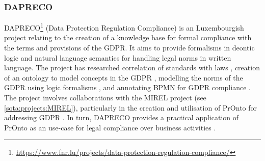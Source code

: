 \subsubsection{DAPRECO}\label{sota:projects:DAPRECO}
DAPRECO\footnote{\url{https://www.fnr.lu/projects/data-protection-regulation-compliance/}} (Data Protection Regulation Compliance) is an Luxembourgish project relating to the creation of a knowledge base for formal compliance with the terms and provisions of the GDPR. It aims to provide formalisms in deontic logic and natural language semantics for handling legal norms in written language. The project has researched correlation of standards with laws \cite{bartolini_towards_2016}, creation of an ontology to model concepts in the GDPR \cite{otake_using_2017}, modelling the norms of the GDPR using logic formalisms \cite{bartolini_legal_2018}, and annotating BPMN for GDPR compliance \cite{bartolini_enhancing_2019}.
The project involves collaborations with the MIREL project (see \autoref{sota:projects:MIREL}), particularly in the creation and utilisation of PrOnto for addressing GDPR \cite{monica_legal_2018,palmirani_pronto:_2018,palmirani_pronto:_2018-1,bartolini_enhancing_2019}. In turn, DAPRECO provides a practical application of PrOnto as an use-case for legal compliance over business activities \cite{bartolini_enhancing_2019,bartolini_agile_2019}.

